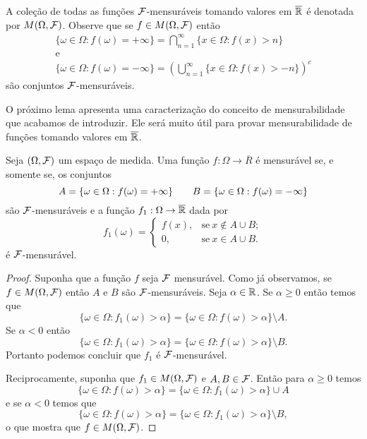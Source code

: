 A coleção de todas as funções $\mathcal{F}$-mensuráveis 
tomando valores em $\overline{\mathbb{R}}$ é denotada por
$M(\Omega,\mathcal{F})$. Observe que se $f\in M(\Omega,\mathcal{F})$
então 
%
\[
\begin{array}{c}
	\displaystyle
	\{ \omega\in\Omega: f(\omega)=+\infty \}
	=
	\bigcap_{n=1}^{\infty} \{x\in\Omega: f(x)>n\}
	\\[0.3cm]
	\text{e}
	\\[0.3cm]
	\displaystyle
	\{ \omega\in\Omega: f(\omega)=-\infty \}
	=
	\left( 
		\bigcup_{n=1}^{\infty} \{x\in\Omega: f(x)>-n\}
	\right)^c
\end{array}
\]
são conjuntos $\mathcal{F}$-mensuráveis.



O próximo lema apresenta uma caracterização 
do conceito de mensurabilidade que acabamos de introduzir.
Ele será muito útil para provar mensurabilidade de funções
tomando valores em $\overline{\mathbb{R}}$. 


\begin{lema}\label{lema-truncamento-func-mensuravel-eh-mensuravel}
	Seja $(\Omega,\mathcal{F})$ um espaço de medida. 
	Uma função $f:\Omega\to\overline{R}$ é 
	mensurável se, e somente se, os conjuntos 
	\[
	A=\{ \omega\in\Omega: f(\omega)=+\infty \}
	\quad
	\text
	\quad
	B=\{ \omega\in\Omega: f(\omega)=-\infty \}	
	\]
	são $\mathcal{F}$-mensuráveis e a função  
	$f_{1}:\Omega\to\overline{\mathbb{R}}$ dada por 
	\[
	f_1(\omega)=
		\begin{cases}
			f(x),&\text{se}\ x\notin A\cup B;
			\\
			0,&\text{se}\ x\in A\cup B.
		\end{cases}
	\]
	é $\mathcal{F}$-mensurável.
\end{lema}



\begin{proof}
Suponha que a função $f$ seja $\mathcal{F}$ mensurável. 
Como já observamos, se $f\in M(\Omega,\mathcal{F})$ então $A$ e $B$ 
são $\mathcal{F}$-mensuráveis. Seja $\alpha\in \mathbb{R}$. Se $\alpha\geq 0$
então temos que 
\[
	\{\omega\in\Omega:f_1(\omega)>\alpha\}
	=
	\{\omega\in\Omega:f(\omega)>\alpha\}
	\setminus A.	
\] 
Se $\alpha<0$ então 
\[	
	\{\omega\in\Omega:f_1(\omega)>\alpha\}
	=
	\{\omega\in\Omega:f(\omega)>\alpha\}
	\setminus B.	
\]
Portanto podemos concluir que $f_1$ é $\mathcal{F}$-mensurável.


Reciprocamente, suponha que $f_1\in M(\Omega,\mathcal{F})$ e $A,B\in\mathcal{F}$.
Então para $\alpha\geq 0$ temos
\[
	\{\omega\in\Omega:f(\omega)>\alpha\}
	=
	\{\omega\in\Omega:f_1(\omega)>\alpha\}
	\cup A	
\] 
e se $\alpha<0$ temos que
\[
	\{\omega\in\Omega:f(\omega)>\alpha\}
	=
	\{\omega\in\Omega:f_1(\omega)>\alpha\}
	\setminus B,	
\] 
o que mostra que $f\in M(\Omega,\mathcal{F})$.
\end{proof}



